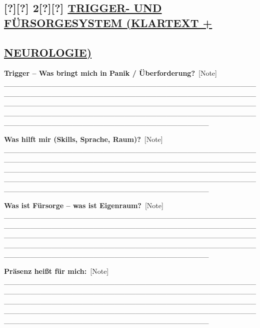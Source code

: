 \hypertarget{trigger--und-fuxfcrsorgesystem-klartext}{%
\subsection{\texorpdfstring{[?][?] 2[?][?] \textbf{\ul{TRIGGER- UND FÜRSORGESYSTEM (KLARTEXT +}}}{[?][?] 2[?][?] TRIGGER- UND FÜRSORGESYSTEM (KLARTEXT +}}\label{trigger--und-fuxfcrsorgesystem-klartext}}

\hypertarget{neurologie}{%
\subsection{\texorpdfstring{ \textbf{\ul{NEUROLOGIE)}}}{ NEUROLOGIE)}}\label{neurologie}}

\textbf{Trigger -- Was bringt mich in Panik / Überforderung?}\
[Note] \_\_\_\_\_\_\_\_\_\_\_\_\_\_\_\_\_\_\_\_\_\_\_\_\_\_\_\_\_\_\_\_\_\_\_\_\_\_\_\_\_\_\_\_\_\_\_\_\_\_\_\_\_\_\_\_\_\_\_\_\_\_\_\_\_\_\_\_\_\_\_\_\_\_\_\_\_\_\_\_\_\_\_\_\_\_\_\_\_\_\_\_\_\_\_\_\_\_\_\_\_\_\_\_\_\_\_\_\_\_\_\_\_\_\_\_\_\_\_\_\_\_\_\_\_\_\_\_\_\_\_\_\_\_\_\_\_\_\_\_\_\_\_\_\_\_\_\_\_\_\_\_\_\_\_\_\_\_\_\_\_\_\_\_\_\_\_\_\_\_\_\_\_\_\_\_\_\_\_\_\_\_\_\_\_\_\_\_\_\_\_\_\_\_\_\_\_\_\_\_\_\_\_\_\_\_\_\_\_\_\_\_\_\_\_\_\_\_\_\_\_\_\_\_\_\_\_\_\_\_\_

\textbf{Was hilft mir (Skills, Sprache, Raum)?}\
[Note] \_\_\_\_\_\_\_\_\_\_\_\_\_\_\_\_\_\_\_\_\_\_\_\_\_\_\_\_\_\_\_\_\_\_\_\_\_\_\_\_\_\_\_\_\_\_\_\_\_\_\_\_\_\_\_\_\_\_\_\_\_\_\_\_\_\_\_\_\_\_\_\_\_\_\_\_\_\_\_\_\_\_\_\_\_\_\_\_\_\_\_\_\_\_\_\_\_\_\_\_\_\_\_\_\_\_\_\_\_\_\_\_\_\_\_\_\_\_\_\_\_\_\_\_\_\_\_\_\_\_\_\_\_\_\_\_\_\_\_\_\_\_\_\_\_\_\_\_\_\_\_\_\_\_\_\_\_\_\_\_\_\_\_\_\_\_\_\_\_\_\_\_\_\_\_\_\_\_\_\_\_\_\_\_\_\_\_\_\_\_\_\_\_\_\_\_\_\_\_\_\_\_\_\_\_\_\_\_\_\_\_\_\_\_\_\_\_\_\_\_\_\_\_\_\_\_\_\_\_\_\_

\textbf{Was ist Fürsorge -- was ist Eigenraum?}\
[Note] \_\_\_\_\_\_\_\_\_\_\_\_\_\_\_\_\_\_\_\_\_\_\_\_\_\_\_\_\_\_\_\_\_\_\_\_\_\_\_\_\_\_\_\_\_\_\_\_\_\_\_\_\_\_\_\_\_\_\_\_\_\_\_\_\_\_\_\_\_\_\_\_\_\_\_\_\_\_\_\_\_\_\_\_\_\_\_\_\_\_\_\_\_\_\_\_\_\_\_\_\_\_\_\_\_\_\_\_\_\_\_\_\_\_\_\_\_\_\_\_\_\_\_\_\_\_\_\_\_\_\_\_\_\_\_\_\_\_\_\_\_\_\_\_\_\_\_\_\_\_\_\_\_\_\_\_\_\_\_\_\_\_\_\_\_\_\_\_\_\_\_\_\_\_\_\_\_\_\_\_\_\_\_\_\_\_\_\_\_\_\_\_\_\_\_\_\_\_\_\_\_\_\_\_\_\_\_\_\_\_\_\_\_\_\_\_\_\_\_\_\_\_\_\_\_\_\_\_\_\_\_

\textbf{Präsenz heißt für mich:}\
[Note] \_\_\_\_\_\_\_\_\_\_\_\_\_\_\_\_\_\_\_\_\_\_\_\_\_\_\_\_\_\_\_\_\_\_\_\_\_\_\_\_\_\_\_\_\_\_\_\_\_\_\_\_\_\_\_\_\_\_\_\_\_\_\_\_\_\_\_\_\_\_\_\_\_\_\_\_\_\_\_\_\_\_\_\_\_\_\_\_\_\_\_\_\_\_\_\_\_\_\_\_\_\_\_\_\_\_\_\_\_\_\_\_\_\_\_\_\_\_\_\_\_\_\_\_\_\_\_\_\_\_\_\_\_\_\_\_\_\_\_\_\_\_\_\_\_\_\_\_\_\_\_\_\_\_\_\_\_\_\_\_\_\_\_\_\_\_\_\_\_\_\_\_\_\_\_\_\_\_\_\_\_\_\_\_\_\_\_\_\_\_\_\_\_\_\_\_\_\_\_\_\_\_\_\_\_\_\_\_\_\_\_\_\_\_\_\_\_\_\_\_\_\_\_\_\_\_\_\_\_\_\_

